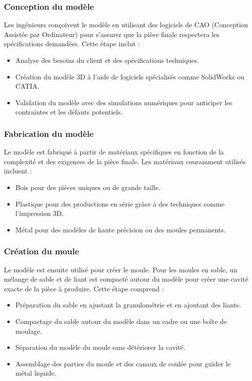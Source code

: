 \documentclass[12pt]{article}
\begin{document}
\subsubsection{Conception du modèle}
Les ingénieurs conçoivent le modèle en utilisant des logiciels de CAO (Conception Assistée par Ordinateur) pour s'assurer que la pièce finale respectera les spécifications demandées. Cette étape inclut :

\begin{itemize}
    \item Analyse des besoins du client et des spécifications techniques.
    \item Création du modèle 3D à l'aide de logiciels spécialisés comme SolidWorks ou CATIA.
    \item Validation du modèle avec des simulations numériques pour anticiper les contraintes et les défauts potentiels.
\end{itemize}

\subsubsection{Fabrication du modèle}
Le modèle est fabriqué à partir de matériaux spécifiques en fonction de la complexité et des exigences de la pièce finale. Les matériaux couramment utilisés incluent :

\begin{itemize}
    \item Bois pour des pièces uniques ou de grande taille.
    \item Plastique pour des productions en série grâce à des techniques comme l'impression 3D.
    \item Métal pour des modèles de haute précision ou des moules permanents.
\end{itemize}

\subsubsection{Création du moule}
Le modèle est ensuite utilisé pour créer le moule. Pour les moules en sable, un mélange de sable et de liant est compacté autour du modèle pour créer une cavité exacte de la pièce à produire. Cette étape comprend :

\begin{itemize}
    \item Préparation du sable en ajustant la granulométrie et en ajoutant des liants.
    \item Compactage du sable autour du modèle dans un cadre ou une boîte de moulage.
    \item Séparation du modèle du moule sans détériorer la cavité.
    \item Assemblage des parties du moule et des canaux de coulée pour guider le métal liquide.
\end{itemize}
\end{document}
